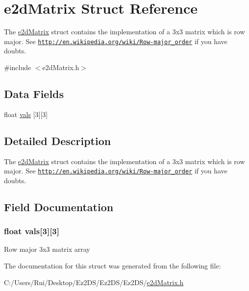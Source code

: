 \hypertarget{structe2d_matrix}{\section{e2d\-Matrix Struct Reference}
\label{structe2d_matrix}
}


The \hyperlink{structe2d_matrix}{e2d\-Matrix} struct contains the implementation of a 3x3 matrix which is row major. See \href{http://en.wikipedia.org/wiki/Row-major_order}{\tt http\-://en.\-wikipedia.\-org/wiki/\-Row-\/major\-\_\-order} if you have doubts.  




{\ttfamily \#include $<$e2d\-Matrix.\-h$>$}

\subsection*{Data Fields}
\begin{DoxyCompactItemize}
\item 
float \hyperlink{structe2d_matrix_ac06a92ccf2617d904678c51c6cf5a9bb}{vals} \mbox{[}3\mbox{]}\mbox{[}3\mbox{]}
\end{DoxyCompactItemize}


\subsection{Detailed Description}
The \hyperlink{structe2d_matrix}{e2d\-Matrix} struct contains the implementation of a 3x3 matrix which is row major. See \href{http://en.wikipedia.org/wiki/Row-major_order}{\tt http\-://en.\-wikipedia.\-org/wiki/\-Row-\/major\-\_\-order} if you have doubts. 

\subsection{Field Documentation}
\hypertarget{structe2d_matrix_ac06a92ccf2617d904678c51c6cf5a9bb}{
\subsubsection[{vals}]{\setlength{\rightskip}{0pt plus 5cm}float {\bf vals}\mbox{[}3\mbox{]}\mbox{[}3\mbox{]}}}\label{structe2d_matrix_ac06a92ccf2617d904678c51c6cf5a9bb}
Row major 3x3 matrix array 

The documentation for this struct was generated from the following file\-:\begin{DoxyCompactItemize}
\item 
C\-:/\-Users/\-Rui/\-Desktop/\-Ez2\-D\-S/\-Ez2\-D\-S/\-Ez2\-D\-S/\hyperlink{e2d_matrix_8h}{e2d\-Matrix.\-h}\end{DoxyCompactItemize}
